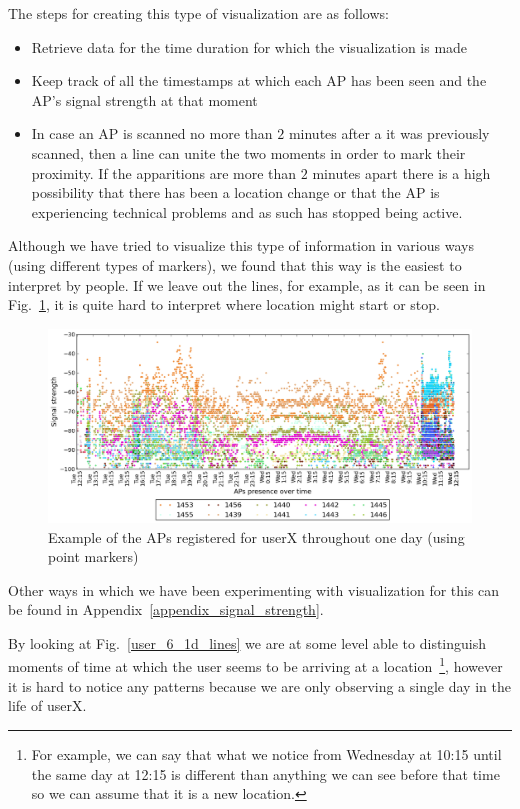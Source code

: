 The steps for creating this type of visualization are as follows:
\begin{itemize}
  \item Retrieve data for the time duration for which the visualization is made
  \item Keep track of all the timestamps at which each AP has been seen and the
  AP's signal strength at that moment
  \item In case an AP is scanned no more than $2$ minutes after a it was
  previously scanned, then a line can unite the two moments in order to mark
  their proximity. If the apparitions are more than $2$ minutes apart there is
  a high possibility that there has been a location change or that the AP is
  experiencing technical problems and as such has stopped being active.
\end{itemize}

Although we have tried to visualize this type of information in various ways
(using different types of markers), we found that this way is the easiest to
interpret by people. If we leave out the lines, for example, as it can be seen
in Fig.~\ref{user_6_1d_point}, it is quite hard to interpret where location
might start or stop.

\begin{figure}[h]
\centering
\includegraphics[width
=\textwidth, height =
0.4\textwidth]{figures/point_user_6_sorted_1days_plot.png}
\caption{Example of the APs registered for userX throughout one day (using
point markers)}
\label{user_6_1d_point}
\end{figure}

Other ways in which we have been experimenting with visualization for this can
be found in Appendix~\ref{appendix_signal_strength}.

By looking at Fig.~\ref{user_6_1d_lines} we are at some level able to
distinguish moments of time at which the user seems to be arriving at a
location~\footnote{For example, we can say that what we notice from Wednesday
at 10:15 until the same day at 12:15 is different than anything we can see
before that time so we can assume that it is a new location.}, however it is
hard to notice any patterns because we are only observing a single day in the
life of userX. 

